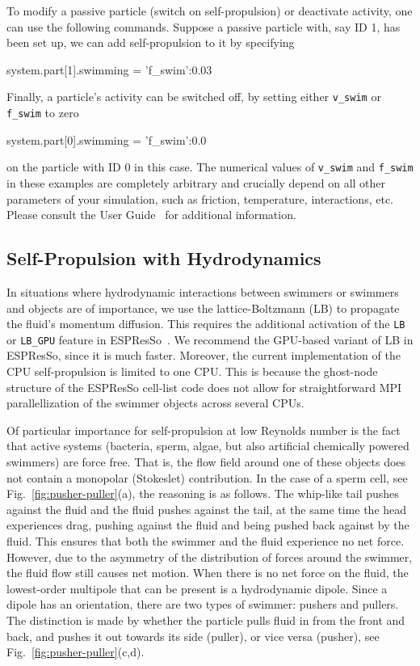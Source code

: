 \documentclass[aip,jcp,reprint,a4paper,onecolumn,amsmath]{revtex4-1}
\newcommand\code{\lstinline}
\newcommand{\es}{\mbox{\textsf{ESPResSo}}\xspace}
\newcommand\codees{\lstinline[language=python]}
\begin{document}
To modify a passive particle (switch on self-propulsion) or deactivate activity, one can use the following commands. Suppose a passive particle with, say ID 1, has been set up, we can add self-propulsion to it by specifying
\begin{espresso}
system.part[1].swimming = {'f_swim':0.03}
\end{espresso}
Finally, a particle's activity can be switched off, by setting either \codees{v_swim} or \codees{f_swim} to zero
\begin{espresso}
system.part[0].swimming = {'f_swim':0.0}
\end{espresso}
on the particle with ID 0 in this case. The numerical values of \codees{v_swim} and \codees{f_swim} in these examples are completely arbitrary and crucially depend on all other parameters of your simulation, such as friction, temperature, interactions, etc. Please consult the User Guide~\cite{UG} for additional information.

\subsection{\label{sub:lattice}Self-Propulsion with Hydrodynamics}

In situations where hydrodynamic interactions between swimmers or swimmers and objects are of importance, we use the lattice-Boltzmann (LB) to propagate the fluid's momentum diffusion. This requires the additional activation of the \code{LB} or \code{LB_GPU} feature in \es{}~\cite{UG,Arnold_13,roehm12}. We recommend the GPU-based variant of LB in \es{}, since it is much faster. Moreover, the current implementation of the CPU self-propulsion is limited to one CPU. This is because the ghost-node structure of the \es{} cell-list code does not allow for straightforward MPI parallellization of the swimmer objects across several CPUs.

Of particular importance for self-propulsion at low Reynolds number is the fact that active systems (bacteria, sperm, algae, but also artificial chemically powered swimmers) are force free. That is, the flow field around one of these objects does not contain a monopolar (Stokeslet) contribution. In the case of a sperm cell, see Fig.~\ref{fig:pusher-puller}(a), the reasoning is as follows. The whip-like tail pushes against the fluid and the fluid pushes against the tail, at the same time the head experiences drag, pushing against the fluid and being pushed back against by the fluid. This ensures that both the swimmer and the fluid experience no net force. However, due to the asymmetry of the distribution of forces around the swimmer, the fluid flow still causes net motion. When there is no net force on the fluid, the lowest-order multipole that can be present is a hydrodynamic dipole. Since a dipole has an orientation, there are two types of swimmer: pushers and pullers. The distinction is made by whether the particle pulls fluid in from the front and back, and pushes it out towards its side (puller), or vice versa (pusher), see Fig.~\ref{fig:pusher-puller}(c,d).
\end{document}
